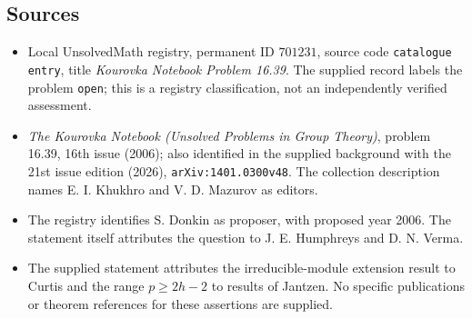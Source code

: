 \documentclass[11pt]{article}
\begin{document}
\subsection{Sources}
\begin{itemize}
\item Local UnsolvedMath registry, permanent ID \(701231\), source code \texttt{catalogue entry}, title \emph{Kourovka Notebook Problem 16.39}. The supplied record labels the problem \texttt{open}; this is a registry classification, not an independently verified assessment.
\item \emph{The Kourovka Notebook (Unsolved Problems in Group Theory)}, problem 16.39, 16th issue (2006); also identified in the supplied background with the 21st issue edition (2026), \texttt{arXiv:1401.0300v48}. The collection description names E. I. Khukhro and V. D. Mazurov as editors.
\item The registry identifies S. Donkin as proposer, with proposed year 2006. The statement itself attributes the question to J. E. Humphreys and D. N. Verma.
\item The supplied statement attributes the irreducible-module extension result to Curtis and the range \(p\geq 2h-2\) to results of Jantzen. No specific publications or theorem references for these assertions are supplied.
\end{itemize}
\end{document}
